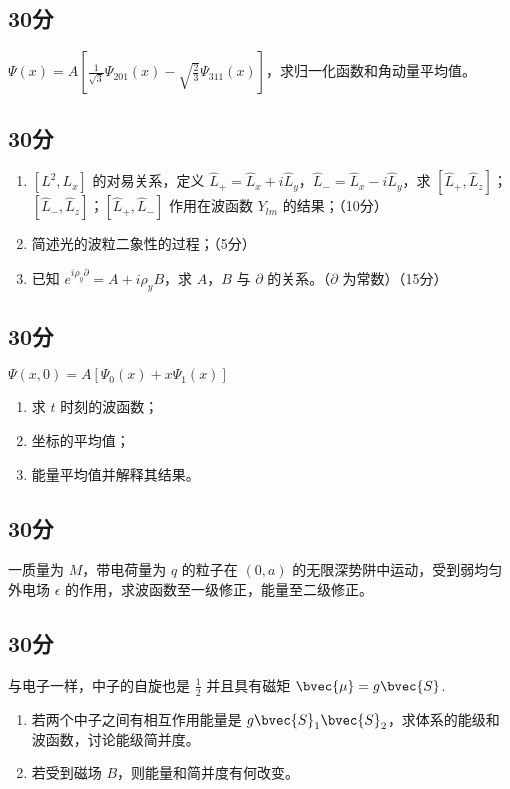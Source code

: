 
\subsection{30分}
$\displaystyle \varPsi (x)=A\left[\frac{1}{\sqrt{3}}\varPsi_{201}(x)-\sqrt{\frac{2}{3}}\varPsi_{311}(x)\right]$，求归一化函数和角动量平均值。
\subsection{30分}
\begin{enumerate}
\item $[L^{2},L_{x}]$ 的对易关系，定义 $\hat{L}_{+}=\hat{L}_{x}+i\hat{L}_{y}$，$\hat{L}_{-}=\hat{L}_{x}-i\hat{L}_{y}$，求 $[\hat{L}_{+},\hat{L}_{z}]$；$[\hat{L}_{-},\hat{L}_{z}]$；$[\hat{L}_{+},\hat{L}_{-}]$ 作用在波函数 $Y_{lm}$ 的结果；（10分）
\item 简述光的波粒二象性的过程；（5分）
\item 已知 $e^{i\rho_{y}\partial}=A+i\rho_{y}B$，求 $A$，$B$ 与 $\partial$ 的关系。（$\partial$ 为常数）（15分）
\end{enumerate}
\subsection{30分}
$\varPsi (x,0)=A[\varPsi_{0}(x)+x\varPsi_{1}(x)]$
\begin{enumerate}
\item 求 $t$ 时刻的波函数；
\item 坐标的平均值；
\item 能量平均值并解释其结果。
\end{enumerate}
\subsection{30分}
一质量为 $M$，带电荷量为 $q$ 的粒子在 $(0,a)$ 的无限深势阱中运动，受到弱均匀外电场 $\epsilon$ 的作用，求波函数至一级修正，能量至二级修正。
\subsection{30分}
与电子一样，中子的自旋也是 $\frac{1}{2}$ 并且具有磁矩 $\bvec{\mu}=g\bvec{S}$.
\begin{enumerate}
\item 若两个中子之间有相互作用能量是 $g\bvec{S}_{1}\bvec{S}_{2}$，求体系的能级和波函数，讨论能级简并度。
\item 若受到磁场 $B$，则能量和简并度有何改变。
\end{enumerate}
